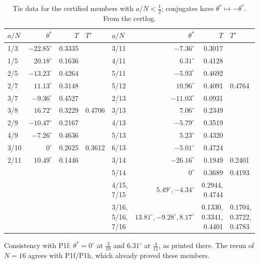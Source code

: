 \documentclass[11pt]{article}
\theoremstyle{remark}\newtheorem{remark}[theorem]{Remark}
\begin{document}
\begin{table}[h]\centering\small
\caption{Tie data for the certified members with $a/N<\frac12$; conjugates have $\theta^*\mapsto-\theta^*$. From the certlog.}\label{tab:data}
\begin{tabular}{lrrl|lrrl}\toprule
$a/N$ & $\theta^*$ & $T$ & $T'$ & $a/N$ & $\theta^*$ & $T$ & $T'$\\\midrule
1/3 & $-22.85^\circ$ & 0.3335 & & 3/11 & $-7.36^\circ$ & 0.3017 &\\
1/5 & $20.18^\circ$ & 0.1636 & & 4/11 & $6.31^\circ$ & 0.4128 &\\
2/5 & $-13.23^\circ$ & 0.4264 & & 5/11 & $-5.93^\circ$ & 0.4692 &\\
2/7 & $11.13^\circ$ & 0.3148 & & 5/12 & $10.96^\circ$ & 0.4091 & 0.4764\\
3/7 & $-9.36^\circ$ & 0.4527 & & 2/13 & $-11.03^\circ$ & 0.0931 &\\
3/8 & $16.72^\circ$ & 0.3229 & 0.4706 & 3/13 & $7.06^\circ$ & 0.2349 &\\
2/9 & $-10.47^\circ$ & 0.2167 & & 4/13 & $-5.79^\circ$ & 0.3519 &\\
4/9 & $-7.26^\circ$ & 0.4636 & & 5/13 & $5.23^\circ$ & 0.4320 &\\
3/10 & $0^\circ$ & 0.2625 & 0.3612 & 6/13 & $-5.01^\circ$ & 0.4724 &\\
2/11 & $10.49^\circ$ & 0.1446 & & 3/14 & $-26.16^\circ$ & 0.1949 & 0.2401\\
 & & & & 5/14 & $0^\circ$ & 0.3689 & 0.4193\\
 & & & & 4/15, 7/15 & $5.49^\circ,-4.34^\circ$ & 0.2944, 0.4744 &\\
 & & & & 3/16, 5/16, 7/16 & $13.81^\circ,-9.28^\circ,8.17^\circ$ & 0.1330, 0.3341, 0.4401 & 0.1704, 0.3722, 0.4783\\\bottomrule
\end{tabular}\end{table}
Consistency with P1f: $\theta^*=0^\circ$ at $\frac3{10}$ and $6.31^\circ$ at $\frac4{11}$, as printed there. The rerun of $N=16$ agrees with P1f/P1h, which already proved these members.
\end{document}
